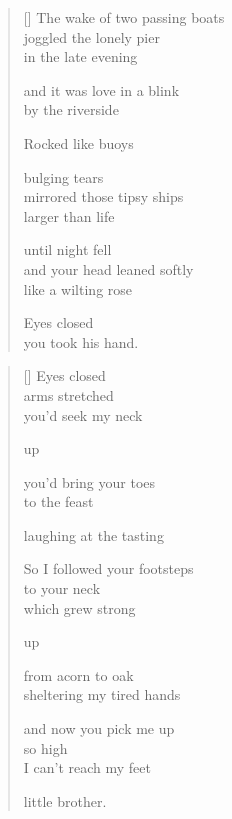\documentclass[14pt]{extbook}
\newcommand*{\centeredornament}{\centerline{\pgfornament[width=6cm]{88}}}
\begin{document}

\newpage

\vspace*{-15mm}
\centeredornament
\vspace*{-7mm}


\settowidth{\versewidth}{The wake of two passing boats}

\begin{verse}[\versewidth]
  The wake of two passing boats \\
  joggled the lonely pier \\
  in the late evening

  and it was love in a blink \\
  by the riverside

  Rocked like buoys

  bulging tears \\
  mirrored those tipsy ships \\
  larger than life

  until night fell \\
  and your head leaned softly \\
  like a wilting rose

  Eyes closed \\
  you took his hand.
\end{verse}


\newpage

\vspace*{-15mm}
\centeredornament
\vspace*{-7mm}


\settowidth{\versewidth}{So I followed your footsteps}

\begin{verse}[\versewidth]
  Eyes closed \\
  arms stretched \\
  you'd seek my neck

  up

  you'd bring your toes \\
  to the feast

  laughing at the tasting

  So I followed your footsteps \\
  to your neck \\
  which grew strong

  up

  from acorn to oak \\
  sheltering my tired hands

  and now you pick me up \\
  so high \\
  I can't reach my feet

  little brother.
\end{verse}
\end{document}

